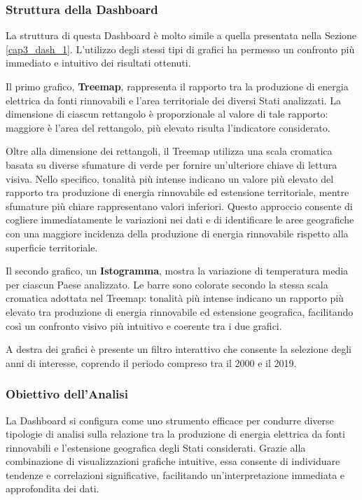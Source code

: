 \subsubsection{Struttura della Dashboard}

La struttura di questa Dashboard è molto simile a quella presentata nella Sezione \ref{cap3_dash_1}. L'utilizzo degli stessi tipi di grafici ha permesso un confronto più immediato e intuitivo dei risultati ottenuti.

Il primo grafico, \textbf{Treemap}, rappresenta il rapporto tra la produzione di energia elettrica da fonti rinnovabili e l'area territoriale dei diversi Stati analizzati. La dimensione di ciascun rettangolo è proporzionale al valore di tale rapporto: maggiore è l'area del rettangolo, più elevato risulta l'indicatore considerato.  

Oltre alla dimensione dei rettangoli, il Treemap utilizza una scala cromatica basata su diverse sfumature di verde per fornire un'ulteriore chiave di lettura visiva. Nello specifico, tonalità più intense indicano un valore più elevato del rapporto tra produzione di energia rinnovabile ed estensione territoriale, mentre sfumature più chiare rappresentano valori inferiori. Questo approccio consente di cogliere immediatamente le variazioni nei dati e di identificare le aree geografiche con una maggiore incidenza della produzione di energia rinnovabile rispetto alla superficie territoriale.  

Il secondo grafico, un \textbf{Istogramma}, mostra la variazione di temperatura media per ciascun Paese analizzato. Le barre sono colorate secondo la stessa scala cromatica adottata nel Treemap: tonalità più intense indicano un rapporto più elevato tra produzione di energia rinnovabile ed estensione geografica, facilitando così un confronto visivo più intuitivo e coerente tra i due grafici.  

A destra dei grafici è presente un filtro interattivo che consente la selezione degli anni di interesse, coprendo il periodo compreso tra il 2000 e il 2019.

\subsubsection{Obiettivo dell'Analisi}

La Dashboard si configura come uno strumento efficace per condurre diverse tipologie di analisi sulla relazione tra la produzione di energia elettrica da fonti rinnovabili e l'estensione geografica degli Stati considerati. Grazie alla combinazione di visualizzazioni grafiche intuitive, essa consente di individuare tendenze e correlazioni significative, facilitando un'interpretazione immediata e approfondita dei dati.  


